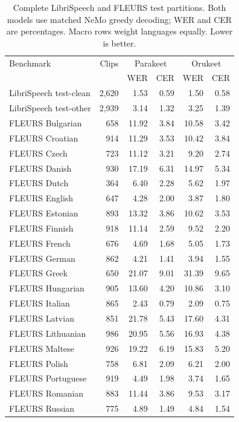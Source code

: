 \begin{table}[!ht]
\centering
\caption{Complete LibriSpeech and FLEURS test partitions. Both models use matched NeMo greedy decoding; WER and CER are percentages. Macro rows weight languages equally. Lower is better.}
\label{tab:standard-benchmarks}
\small
\setlength{\tabcolsep}{5pt}
\renewcommand{\arraystretch}{1.05}
\begin{tabular}{lrrrrr}
\toprule
Benchmark & Clips & \multicolumn{2}{c}{Parakeet} & \multicolumn{2}{c}{Orukeet}\\
 & & WER & CER & WER & CER\\
\midrule
LibriSpeech test-clean & 2,620 & 1.53 & 0.59 & 1.50 & 0.58\\
LibriSpeech test-other & 2,939 & 3.14 & 1.32 & 3.25 & 1.39\\
\midrule
FLEURS Bulgarian & 658 & 11.92 & 3.84 & 10.58 & 3.42\\
FLEURS Croatian & 914 & 11.29 & 3.53 & 10.42 & 3.84\\
FLEURS Czech & 723 & 11.12 & 3.21 & 9.20 & 2.74\\
FLEURS Danish & 930 & 17.19 & 6.31 & 14.97 & 5.34\\
FLEURS Dutch & 364 & 6.40 & 2.28 & 5.62 & 1.97\\
FLEURS English & 647 & 4.28 & 2.00 & 3.87 & 1.80\\
FLEURS Estonian & 893 & 13.32 & 3.86 & 10.62 & 3.53\\
FLEURS Finnish & 918 & 11.14 & 2.59 & 9.52 & 2.20\\
FLEURS French & 676 & 4.69 & 1.68 & 5.05 & 1.73\\
FLEURS German & 862 & 4.21 & 1.41 & 3.94 & 1.55\\
FLEURS Greek & 650 & 21.07 & 9.01 & 31.39 & 9.65\\
FLEURS Hungarian & 905 & 13.60 & 4.20 & 10.86 & 3.10\\
FLEURS Italian & 865 & 2.43 & 0.79 & 2.09 & 0.75\\
FLEURS Latvian & 851 & 21.78 & 5.43 & 17.60 & 4.31\\
FLEURS Lithuanian & 986 & 20.95 & 5.56 & 16.93 & 4.38\\
FLEURS Maltese & 926 & 19.22 & 6.19 & 15.83 & 5.20\\
FLEURS Polish & 758 & 6.81 & 2.09 & 6.21 & 2.00\\
FLEURS Portuguese & 919 & 4.49 & 1.98 & 3.74 & 1.65\\
FLEURS Romanian & 883 & 11.44 & 3.86 & 9.53 & 3.17\\
FLEURS Russian & 775 & 4.89 & 1.49 & 4.84 & 1.54\\

\end{tabular}
\end{table}
